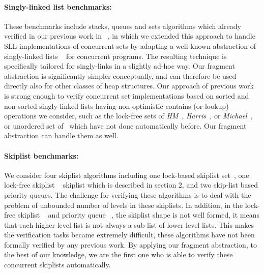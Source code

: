 \paragraph{Singly-linked list benchmarks:} These benchmarks include stacks, queues and sets algorithms which already verified in our previous work in ~\cite{Quy:sas16}, in which we extended this approach to handle SLL implementations of concurrent sets by adapting a well-known abstraction of singly-linked lists ~\cite{MYRS:Canonical} for concurrent programs.
The resulting technique is specifically tailored for singly-links in a slightly ad-hoc way.
Our fragment abstraction is significantly simpler conceptually, and can therefore be used directly
also for other classes of heap structures. Our approach of previous work is strong enough to verify  concurrent set
implementations based on sorted and non-sorted singly-linked lists having non-optimistic contains (or lookup) operations we consider, such as the lock-free sets of {\it HM}~\cite{ArtOfMpP}, {\it Harris}~\cite{Harris:list}, or {\it Michael}~\cite{Michael:list}, or unordered set of~\cite{Zhang:unorderedlist} which have not done automatically before. Our fragment abstraction can handle them as well.

\paragraph{Skiplist benchmarks:} We consider four skiplist algorithms including one lock-based skiplist set~\cite{MS:QueueAlgorithms}, one lock-free skiplist ~\cite{ArtOfMpP} skiplist which is described in section 2, and two skip-list based priority queues. The challenge for verifying these algorithms is to deal with the problem of unbounded number of levels in these skiplists. In addition, in the lock-free skiplist ~\cite{ArtOfMpP} and priority queue ~\cite{Linden:opodis13}, the skiplist shape is not well formed, it means that each higher level list is not always a sub-list of lower level lists. This makes the verification tasks became extremely difficult, these algorithms have not been formally verified by any previous work. By applying our fragment abstraction,  to the best of our knowledge, we are the first one who is able to verify these concurrent skiplists automatically. 

